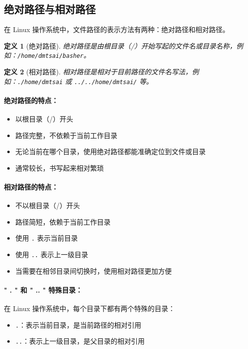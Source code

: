 \documentclass[12pt,UTF8]{ctexbook}
\newtheorem{definition}{定义}[chapter]
\begin{document}
\subsection{绝对路径与相对路径}

在 Linux 操作系统中，文件路径的表示方法有两种：绝对路径和相对路径。

\begin{definition}[绝对路径]
绝对路径是由根目录（/）开始写起的文件名或目录名称，例如：\verb+/home/dmtsai/basher+。
\end{definition}

\begin{definition}[相对路径]
相对路径是相对于目前路径的文件名写法，例如：\verb+./home/dmtsai+ 或 \verb+../../home/dmtsai/+ 等。
\end{definition}

\paragraph{绝对路径的特点：}
\begin{itemize}
    \item 以根目录（/）开头
    \item 路径完整，不依赖于当前工作目录
    \item 无论当前在哪个目录，使用绝对路径都能准确定位到文件或目录
    \item 通常较长，书写起来相对繁琐
\end{itemize}

\paragraph{相对路径的特点：}
\begin{itemize}
    \item 不以根目录（/）开头
    \item 路径简短，依赖于当前工作目录
    \item 使用 \verb+.+ 表示当前目录
    \item 使用 \verb+..+ 表示上一级目录
    \item 当需要在相邻目录间切换时，使用相对路径更加方便
\end{itemize}

\paragraph{" . " 和 " .. " 特殊目录：}
在 Linux 操作系统中，每个目录下都有两个特殊的目录：
\begin{itemize}
    \item \verb+.+：表示当前目录，是当前路径的相对引用
    \item \verb+..+：表示上一级目录，是父目录的相对引用
\end{itemize}
\end{document}
